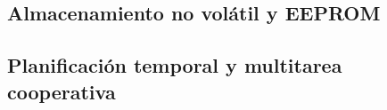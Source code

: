 
\subsection{Almacenamiento no volátil y EEPROM}



\subsection{Planificación temporal y multitarea cooperativa}


